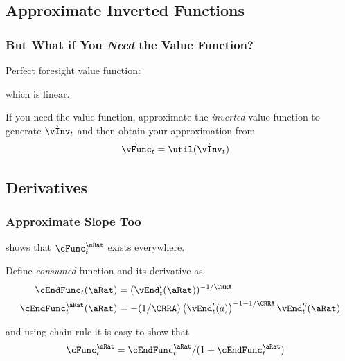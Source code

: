\documentclass{beamer}
\begin{document}
\subsection{Approximate Inverted Functions}
\begin{frame}%
\frametitle{But What if You {\it Need} the Value Function?}

Perfect foresight value function:

which is linear.  

\medskip\medskip
\pause If you need the value function, approximate the {\it inverted} value function to generate $\grave{\vInv}_{t}$ 
and then obtain your approximation from 
\begin{equation}\begin{gathered}\begin{aligned}
  \grave{\vFunc}_{t}  & = \util(\grave{\vInv}_{t})
\end{aligned}\end{gathered}\end{equation}


\end{frame}

\subsection{Derivatives}
\begin{frame}
\frametitle{Approximate Slope Too}

\cite{BufferStockTheory} shows that $\cFunc^{\mRat}_{t}$ exists everywhere.
\medskip

\pause 
Define {\it consumed} function and its derivative as 
\begin{equation}\begin{gathered}\begin{aligned}
  \cEndFunc_{t}(\aRat)  & = (\vEnd^{\prime}_{t}(\aRat))^{-1/\CRRA}
\\ \cEndFunc_{t}^{\aRat}(\aRat)  & = -(1/\CRRA)\left(\vEnd_{t}^{\prime}({a})\right)^{-1-1/\CRRA} \vEnd_{t}^{\prime\prime}(\aRat) 
\end{aligned}\end{gathered}\end{equation}

\pause 
and using chain rule it is easy to show that
\begin{equation}\begin{gathered}\begin{aligned}
 \cFunc^{\mRat}_{t}  & = \cEndFunc^{\aRat}_{t}/(1+\cEndFunc^{\aRat}_{t})
\end{aligned}\end{gathered}\end{equation}

\end{frame}
\end{document}
